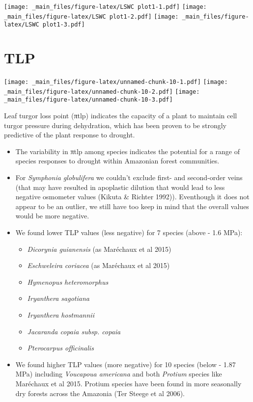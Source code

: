\documentclass[
]{book}
\providecommand{\tightlist}{%
  \setlength{\itemsep}{0pt}\setlength{\parskip}{0pt}}
\begin{document}
\texttt{[image: \_main\_files/figure-latex/LSWC plot1-1.pdf]} \texttt{[image: \_main\_files/figure-latex/LSWC plot1-2.pdf]} \texttt{[image: \_main\_files/figure-latex/LSWC plot1-3.pdf]}

\hypertarget{tlp}{%
\section{TLP}\label{tlp}}

\texttt{[image: \_main\_files/figure-latex/unnamed-chunk-10-1.pdf]} \texttt{[image: \_main\_files/figure-latex/unnamed-chunk-10-2.pdf]} \texttt{[image: \_main\_files/figure-latex/unnamed-chunk-10-3.pdf]}

Leaf turgor loss point (πtlp) indicates the capacity of a plant to maintain cell turgor pressure during dehydration, which has been proven to be strongly predictive of the plant response to drought.

\begin{itemize}
\item
  The variability in πtlp among species indicates the potential for a
  range of species responses to drought within Amazonian forest communities.
\item
  For \emph{Symphonia globulifera} we couldn't exclude first- and second-order veins (that may have resulted in apoplastic dilution that would lead to less negative osmometer values (Kikuta \& Richter 1992)). Eventhough it does not appear to be an outlier, we still have too keep in mind that the overall values would be more negative.
\item
  We found lower TLP values (less negative) for 7 species (above - 1.6 MPa):

  \begin{itemize}
  \tightlist
  \item
    \emph{Dicorynia guianensis} (as Maréchaux et al 2015)
  \item
    \emph{Eschweleira coriacea } (as Maréchaux et al 2015)
  \item
    \emph{Hymenopus heteromorphus}
  \item
    \emph{Iryanthera sagotiana}
  \item
    \emph{Iryanthera hostmannii}
  \item
    \emph{Jacaranda copaia subsp. copaia}
  \item
    \emph{Pterocarpus officinalis}
  \end{itemize}
\item
  We found higher TLP values (more negative) for 10 species (below - 1.87 MPa) including \emph{Voucapoua americana} and both \emph{Protium} species like Maréchaux et al 2015. Protium species have been found in more seasonally dry forests across the Amazonia (Ter Steege et al 2006).
\end{itemize}
\end{document}
